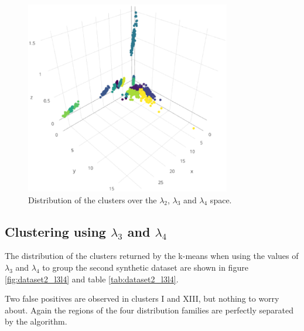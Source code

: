 \begin{figure}[ht]
    \centering
    \includegraphics[width=0.8\textwidth]{img/gld_clustering/datasetII/l2l3l4/l2_l3_l4.eps}
    \caption{Distribution of the clusters over the $\lambda_{2}$, $\lambda_{3}$ and $\lambda_{4}$ space.}
    \label{fig:dataset2_l2l3l4_l2_l3_l4}
\end{figure}

\subsection{Clustering using $\lambda_{3}$ and $\lambda_{4}$}\label{syntheticI_l34}

The distribution of the clusters returned by the k-means when using the values of $\lambda_{3}$ and $\lambda_{4}$ to group the second synthetic dataset are shown in figure \ref{fig:dataset2_l3l4} and table \ref{tab:dataset2_l3l4}.
 
Two false positives are observed in clusters I and XIII, but nothing to worry about. Again the regions of the four distribution families are perfectly separated by the algorithm. 
 
